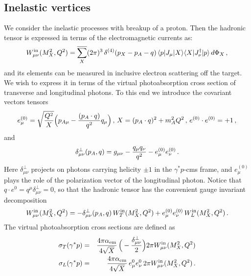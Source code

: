 \subsection{Inelastic vertices}

We consider the inelastic processes with breakup of a proton. 
Then the hadronic tensor is expressed in terms of the electromagnetic currents as:
\begin{eqnarray}
 W^{\rm{in}}_{\mu \nu}(M_X^2,Q^2) = \overline{\sum_X} (2 \pi)^3 \, \delta^{(4)} (p_X - p_A - q) \, \langle {p} | J_\mu | {X} \rangle\langle {X} | J_\nu^\dagger | {p} \rangle \, d\Phi_X \, ,
\label{eq:Wmunu}
\end{eqnarray}
and its elements can be measured in inclusive electron scattering 
off the target. We wish to express it in terms of the virtual photoabsorption cross section
of transverse and longitudinal photons. To this end we introduce the covariant vectors tensors
\begin{eqnarray}
e_\mu^{(0)} = \sqrt{Q^2 \over  X} \Big( p_{A\mu} - { (p_A \cdot q ) \over q^2} q_\mu \Big) \, , \, 
X = (p_A \cdot q)^2 + m_A^2 Q^2 \, , \, e^{(0)}\cdot e^{(0)} = + 1 \, ,
\end{eqnarray}
and
\begin{eqnarray}
\delta^\perp_{\mu \nu}(p_A,q) = g_{\mu \nu} - {q_\mu q_\nu \over q^2} - e^{(0)}_\mu e^{(0)}_\nu \, .
\end{eqnarray}
Here $\delta^\perp_{\mu\nu}$ projects on photons carrying helicity $\pm 1$ in the $\gamma^* p$-cms frame,
and $e_\mu^{(0)}$ plays the role of the polarization vector of the longitudinal photon.
Notice that $q\cdot e^{0} = q^\mu \delta^\perp_{\mu \nu} = 0$, so that the hadronic tensor has the convenient
gauge invariant decomposition
\begin{eqnarray}
  W^{\rm{in}}_{\mu \nu}(M_X^2,Q^2) = - \delta^\perp_{\mu \nu} (p_A,q) \, W^{\rm{in}}_T(M_X^2, Q^2) + e^{(0)}_\mu e^{(0)}_\nu \, W^{\rm{in}}_L(M_X^2, Q^2) \, .
\end{eqnarray}
The virtual photoabsorption cross sections are defined as
\begin{eqnarray}
 \sigma_T(\gamma^* p) &=& {4 \pi {\alpha_{\mathrm{em}}} \over 4 \sqrt{X}} \, \Big(- {\delta^\perp_{\mu\nu} \over 2} \Big)  2\pi W^{\rm{in}}_{\mu \nu}(M_X^2,Q^2) \nonumber \\
 \sigma_L(\gamma^* p) &=& {4 \pi {\alpha_{\mathrm{em}}} \over 4 \sqrt{X}} \, e^{0}_\mu e^{0}_\nu \, 2 \pi W^{\rm{in}}_{\mu \nu}(M_X^2,Q^2) \, .
\end{eqnarray}
